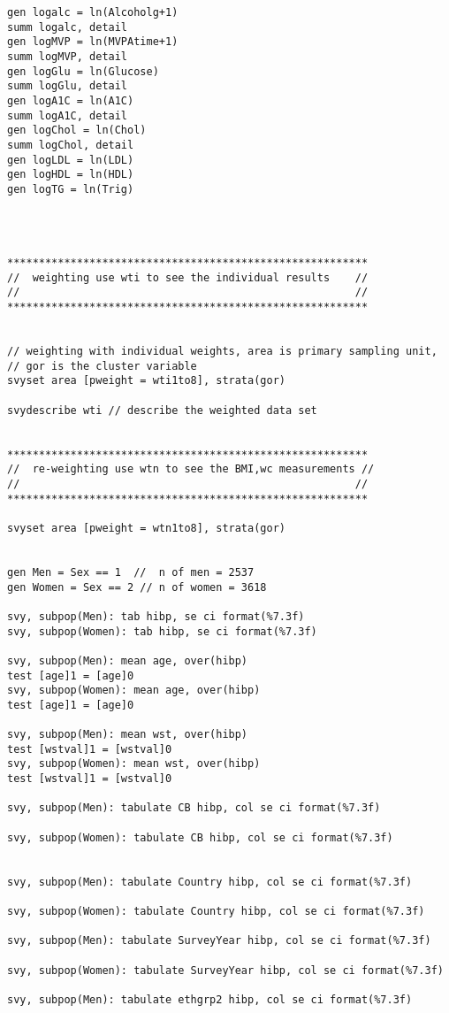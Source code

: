 \documentclass[]{article}
\begin{document}
\begin{verbatim}
gen logalc = ln(Alcoholg+1)
summ logalc, detail
gen logMVP = ln(MVPAtime+1)
summ logMVP, detail
gen logGlu = ln(Glucose)
summ logGlu, detail
gen logA1C = ln(A1C)
summ logA1C, detail
gen logChol = ln(Chol)
summ logChol, detail
gen logLDL = ln(LDL)
gen logHDL = ln(HDL)
gen logTG = ln(Trig)




*********************************************************
//  weighting use wti to see the individual results    //
//                                                     //
*********************************************************


// weighting with individual weights, area is primary sampling unit, 
// gor is the cluster variable
svyset area [pweight = wti1to8], strata(gor)

svydescribe wti // describe the weighted data set


*********************************************************
//  re-weighting use wtn to see the BMI,wc measurements //
//                                                     //
*********************************************************

svyset area [pweight = wtn1to8], strata(gor)


gen Men = Sex == 1  //  n of men = 2537
gen Women = Sex == 2 // n of women = 3618

svy, subpop(Men): tab hibp, se ci format(%7.3f)
svy, subpop(Women): tab hibp, se ci format(%7.3f)

svy, subpop(Men): mean age, over(hibp)
test [age]1 = [age]0
svy, subpop(Women): mean age, over(hibp)
test [age]1 = [age]0

svy, subpop(Men): mean wst, over(hibp)
test [wstval]1 = [wstval]0
svy, subpop(Women): mean wst, over(hibp)
test [wstval]1 = [wstval]0

svy, subpop(Men): tabulate CB hibp, col se ci format(%7.3f)

svy, subpop(Women): tabulate CB hibp, col se ci format(%7.3f)


svy, subpop(Men): tabulate Country hibp, col se ci format(%7.3f)

svy, subpop(Women): tabulate Country hibp, col se ci format(%7.3f)

svy, subpop(Men): tabulate SurveyYear hibp, col se ci format(%7.3f)

svy, subpop(Women): tabulate SurveyYear hibp, col se ci format(%7.3f)

svy, subpop(Men): tabulate ethgrp2 hibp, col se ci format(%7.3f)


\end{verbatim}
\end{document}
